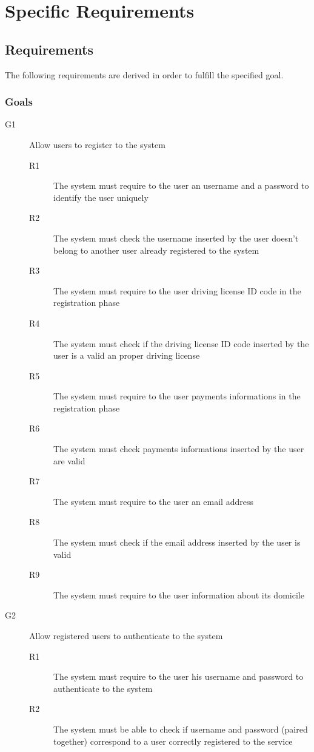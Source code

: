 \section{Specific Requirements}

\subsection{Requirements}
The following requirements are derived in order to fulfill the specified goal.
\subsubsection{Goals}
	\begin{description}
		\item[G1] Allow users to register to the system
		\begin{description}
			\item[R1] The system must require to the user an username and a password to identify the user uniquely
			\item[R2] The system must check the username inserted by the user doesn't belong to another user already registered to the system 
			\item[R3] The system must require to the user driving license ID code in the registration phase
			\item[R4] The system must check if the driving license ID code inserted by the user is a valid an proper driving license
			\item[R5] The system must require to the user payments informations in the registration phase
			\item[R6] The system must check payments informations inserted by the user are valid
			\item[R7] The system must  require to the user an email address
			\item[R8] The system must check if the email address inserted by the user is valid
			\item[R9] The system must  require to the user information about its domicile
		\end{description}
		\item[G2] Allow registered users to authenticate to the system
		\begin{description}
			\item[R1] The system must require to the user his username and password to authenticate to the system
			\item[R2] The system must be able to check if username and password (paired together) correspond to a user correctly registered to the service

\end{description}
\end{description}

